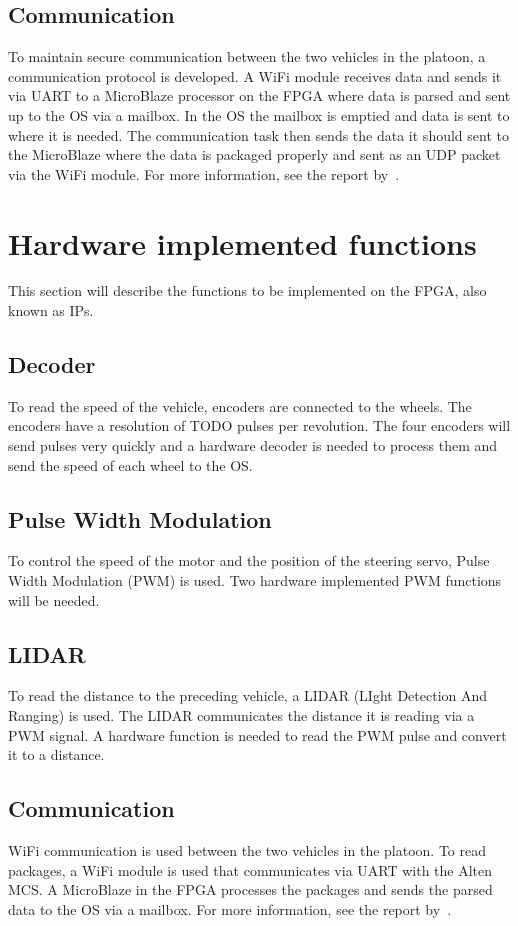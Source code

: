 \subsection{Communication}
To maintain secure communication between the two vehicles in the platoon, a communication protocol is developed. A WiFi module receives data and sends it via UART to a MicroBlaze processor on the FPGA where data is parsed and sent up to the OS via a mailbox. In the OS the mailbox is emptied and data is sent to where it is needed. The communication task then sends the data it should sent to the MicroBlaze where the data is packaged properly and sent as an UDP packet via the WiFi module. For more information, see the report by~\cite{lerander2017}.

\section{Hardware implemented functions}
This section will describe the functions to be implemented on the FPGA, also known as IPs.

\subsection{Decoder}
To read the speed of the vehicle, encoders are connected to the wheels. The encoders have a resolution of TODO pulses per revolution. The four encoders will send pulses very quickly and a hardware decoder is needed to process them and send the speed of each wheel to the OS.

\subsection{Pulse Width Modulation}
To control the speed of the motor and the position of the steering servo, Pulse Width Modulation (PWM) is used. Two hardware implemented PWM functions will be needed.

\subsection{LIDAR}
To read the distance to the preceding vehicle, a LIDAR (LIght Detection And Ranging) is used. The LIDAR communicates the distance it is reading via a PWM signal. A hardware function is needed to read the PWM pulse and convert it to a distance.

\subsection{Communication}
WiFi communication is used between the two vehicles in the platoon. To read packages, a WiFi module is used that communicates via UART with the Alten MCS. A MicroBlaze in the FPGA processes the packages and sends the parsed data to the OS via a mailbox. For more information, see the report by~\cite{lerander2017}.

